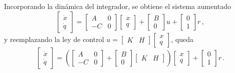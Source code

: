 Incorporando la dinámica del integrador, se obtiene el sistema aumentado
\[
\begin{bmatrix} \dot{x} \\ \dot{q} \end{bmatrix}
=
\begin{bmatrix} A & 0 \\ -C & 0 \end{bmatrix}
\begin{bmatrix} x \\ q \end{bmatrix}
+
\begin{bmatrix} B \\ 0 \end{bmatrix} u
+
\begin{bmatrix} 0 \\ 1 \end{bmatrix} r\,,
\]
y reemplazando la ley de control $u = \begin{bmatrix} K & H \end{bmatrix}\begin{bmatrix} x \\ q \end{bmatrix}$, queda
\[
\begin{bmatrix} \dot{x} \\ \dot{q} \end{bmatrix}
=
\left(
\begin{bmatrix} A & 0 \\ -C & 0 \end{bmatrix}
+
\begin{bmatrix} B \\ 0 \end{bmatrix}
\begin{bmatrix} K & H \end{bmatrix}
\right)
\begin{bmatrix} x \\ q \end{bmatrix}
+
\begin{bmatrix} 0 \\ 1 \end{bmatrix} r\,.
\]


